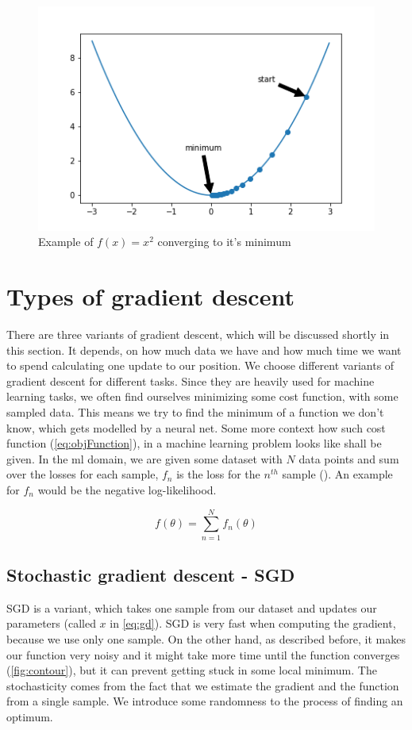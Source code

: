 \documentclass[aodsor,preprint]{imsart}
\numberwithin{equation}{section}
\theoremstyle{plain}
\begin{document}
\begin{figure}[htb]
\centering
\includegraphics[width=\textwidth]{images/gd_ex1.png}
\caption{Example of $f(x) = x^2$ converging to it's minimum}
\label{fig:gdex1}
\end{figure}


\section{Types of gradient descent}
There are three variants of gradient descent, which will be discussed shortly in this section. It depends, on how much data we have and how much time we want to spend calculating one update to our position. We choose different variants of gradient descent for different tasks. Since they are heavily used for machine learning tasks, we often find ourselves minimizing some cost function, with some sampled data. This means we try to find the minimum of a function we don't know, which gets modelled by a neural net. Some more context how such cost function (\ref{eq:objFunction}), in a machine learning problem looks like shall be given. In the ml domain, we are given some dataset with $N$ data points and sum over the losses for each sample, $f_{n}$ is the loss for the $n^{th}$ sample (\cite{Deisenroth2020}). An example for $f_{n}$ would be the negative log-likelihood.

\begin{equation} \label{eq:objFunction2}
f(\theta) = \sum_{n=1}^{N} f_{n}(\theta)
\end{equation}


\subsection{Stochastic gradient descent - SGD}
SGD is a variant, which takes one sample from our dataset and updates our parameters (called $x$ in \ref{eq:gd}). SGD is very fast when computing the gradient, because we use only one sample. On the other hand, as described before, it makes our function very noisy and it might take more time until the function converges (\ref{fig:contour}), but it can prevent getting stuck in some local minimum. The stochasticity comes from the fact that we estimate the gradient and the function from a single sample. We introduce some randomness to the process of finding an optimum.
\end{document}
